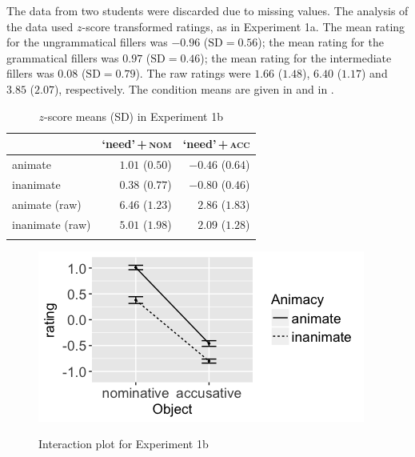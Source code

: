 \documentclass[output=paper]{langscibook}
\begin{document}
The data from two students were discarded due to missing values. The analysis of the data used $z$-score transformed ratings, as in Experiment 1a. The mean rating for the ungrammatical fillers was $-0.96$ ($\text{SD} =0.56$); the mean rating for the grammatical fillers was $0.97$ ($\text{SD} =0.46$); the mean rating for the intermediate fillers was $0.08$ ($\text{SD} =0.79$). The raw ratings were $1.66$ ($1.48$),  $6.40$ ($1.17$) and $3.85$ ($2.07$), respectively. The condition means are given in  and in .\largerpage


\begin{table}
\centering
\begin{tabular}{lrr}
\lsptoprule
   & `need'\,+\,\textsc{nom} & `need'\,+\,\textsc{acc}\\
\midrule
animate  &  $1.01$ ($0.50$) &   $-0.46$ ($0.64$)\\
inanimate  & $0.38$ ($0.77$) &   $-0.80$ ($0.46$)\\
animate (raw)  &   $6.46$ ($1.23$) &  $2.86$ ($1.83$)\\
inanimate (raw)  &   $5.01$ ($1.98$) & $2.09$ ($1.28$)\\
\lspbottomrule
\end{tabular}
\caption{$z$-score means (SD) in Experiment 1b}
\label{tab:1:means-exp1b}
\end{table}

\begin{figure}
\caption{Interaction plot for Experiment 1b}
\centering
\includegraphics[scale = 0.5]{figures/exp1b_13.png}
\label{fig:exp1b}
\end{figure}
\end{document}
